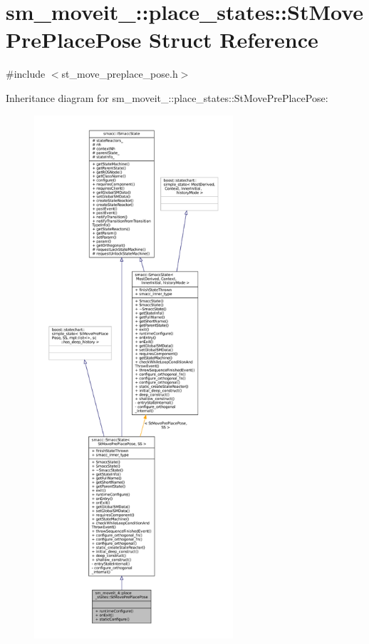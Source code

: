 \hypertarget{structsm__moveit__4_1_1place__states_1_1StMovePrePlacePose}{}\section{sm\+\_\+moveit\+\_\+:\+:place\+\_\+states\+:\+:St\+Move\+Pre\+Place\+Pose Struct Reference}
\label{structsm__moveit__4_1_1place__states_1_1StMovePrePlacePose}


{\ttfamily \#include $<$st\+\_\+move\+\_\+preplace\+\_\+pose.\+h$>$}



Inheritance diagram for sm\+\_\+moveit\+\_\+:\+:place\+\_\+states\+:\+:St\+Move\+Pre\+Place\+Pose\+:
\nopagebreak
\begin{figure}[H]
\begin{center}
\leavevmode
\includegraphics[height=550pt]{structsm__moveit__4_1_1place__states_1_1StMovePrePlacePose__inherit__graph}
\end{center}
\end{figure}


